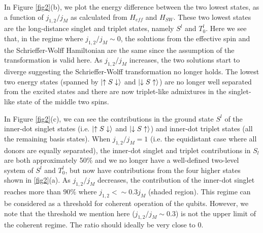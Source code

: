 \documentclass[%
showkeys,
 amsmath,amssymb,
 aps,
prb,
]{revtex4-2}
\begin{document}
In Figure \ref{fig2}(b), we plot the energy difference between the two lowest states, as a function of $j_{1,2}/j_M$ as calculated from $H_{eff}$ and $H_{SW}$. These two lowest states are the long-distance singlet and triplet states, namely $S^l$ and $T^l_0$. Here we see that, in the regime where $j_{1,2}/j_M\sim0$, the solutions from the effective spin and the Schrieffer-Wolff Hamiltonian are the same since the assumption of the transformation is valid here. As $j_{1,2}/j_M$ increases, the two solutions start to diverge suggesting the Schrieffer-Wolff transformation no longer holds. The lowest two energy states (spanned by $\ket{\uparrow S \downarrow}$ and $\ket{\downarrow S \uparrow}$) are no longer well separated from the excited states and there are now triplet-like admixtures in the singlet-like state of the middle two spins. 

In Figure \ref{fig2}(c), we can see the contributions in the ground state $S^l$ of the inner-dot singlet states (i.e. $\ket{\uparrow S \downarrow}$ and $\ket{\downarrow S \uparrow}$) and inner-dot triplet states (all the remaining basis states). When $j_{1,2}/j_M=1$ (i.e. the equidistant case where all donors are equally separated), the inner-dot singlet and triplet contributions in $S_l$ are both approximately 50\% and we no longer have a well-defined two-level system of $S^l$ and $T^l_0$, but now have contributions from the four higher states shown in \ref{fig2}(a). As $j_{1,2}/j_M$ decreases, the contribution of the inner-dot singlet reaches more than $90\%$ where $j_{1,2} <\sim0.3 j_M$ (shaded region). This regime can be considered as a threshold for coherent operation of the qubits. However, we note that the threshold we mention here ($j_{1,2}/j_M\sim0.3$) is not the upper limit of the coherent regime. The ratio should ideally be very close to $0$.
\end{document}
